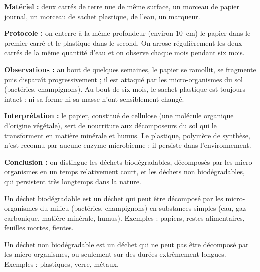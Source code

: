 \documentclass[11pt]{article}
\newcommand{\cle}[1]{{\popxbold\color{popdark}#1}}
\begin{document}
\begin{experience}
\textbf{Matériel :} deux carrés de terre nue de même surface, un morceau de papier journal, un morceau de sachet plastique, de l'eau, un marqueur.

\textbf{Protocole :} on enterre à la même profondeur (environ \SI{10}{cm}) le papier dans le premier carré et le plastique dans le second. On arrose régulièrement les deux carrés de la même quantité d'eau et on observe chaque mois pendant six mois.

\textbf{Observations :} au bout de quelques semaines, le papier se ramollit, se fragmente puis disparaît progressivement ; il est attaqué par les micro-organismes du sol (bactéries, champignons). Au bout de six mois, le sachet plastique est toujours intact : ni sa forme ni sa masse n'ont sensiblement changé.

\textbf{Interprétation :} le papier, constitué de cellulose (une molécule organique d'origine végétale), sert de nourriture aux décomposeurs du sol qui le transforment en matière minérale et humus. Le plastique, polymère de synthèse, n'est reconnu par aucune enzyme microbienne : il persiste dans l'environnement.

\textbf{Conclusion :} on distingue les déchets \cle{biodégradables}, décomposés par les micro-organismes en un temps relativement court, et les déchets \cle{non biodégradables}, qui persistent très longtemps dans la nature.
\end{experience}

\begin{definition}
Un déchet \cle{biodégradable} est un déchet qui peut être décomposé par les micro-organismes du milieu (bactéries, champignons) en substances simples (eau, gaz carbonique, matière minérale, humus). Exemples : papiers, restes alimentaires, feuilles mortes, fientes.

Un déchet \cle{non biodégradable} est un déchet qui ne peut pas être décomposé par les micro-organismes, ou seulement sur des durées extrêmement longues. Exemples : plastiques, verre, métaux.
\end{definition}
\end{document}
